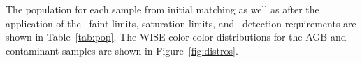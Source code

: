The population for each sample from initial matching as well as after the application of the \allwise\, faint limits, saturation limits, and \twomass\, detection requirements are shown in Table~\ref{tab:pop}. The WISE color-color distributions for the AGB and contaminant samples are shown in Figure~\ref{fig:distros}. \\

\vspace{-10pt}
%

